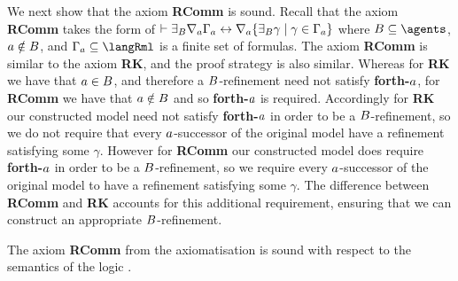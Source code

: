 We next show that the axiom {\bf RComm} is sound.
Recall that the axiom {\bf RComm} takes the form of $\vdash {\exists_{B}} \nabla_{a} \Gamma_a \leftrightarrow \nabla_{a} \{{\exists_{B}} \gamma \mid \gamma \in \Gamma_a\}$ where $\agentsB \subseteq \agents$, $a \notin B$, and $\Gamma_\agentA \subseteq \langRml$ is a finite set of formulas.
The axiom {\bf RComm} is similar to the axiom {\bf RK}, and the proof strategy is also similar.
Whereas for {\bf RK} we have that $a \in B$, and therefore a $B$-refinement need not satisfy {\bf forth-$a$}, for {\bf RComm} we have that $a \notin B$ and so {\bf forth-$a$} is required.
Accordingly for {\bf RK} our constructed model need not satisfy {\bf forth-$a$} in order to be a $B$-refinement, so we do not require that every $a$-successor of the original model have a refinement satisfying some $\gamma$.
However for {\bf RComm} our constructed model does require {\bf forth-$a$} in order to be a $B$-refinement, so we require every $a$-successor of the original model to have a refinement satisfying some $\gamma$.
The difference between {\bf RComm} and {\bf RK} accounts for this additional requirement, ensuring that we can construct an appropriate $B$-refinement.

\begin{lemma}\label{rml-k-rcomm}
The axiom {\bf RComm} from the axiomatisation \axiomRmlK{} is sound with respect to the semantics of the logic \logicRmlK{}.
\end{lemma}

